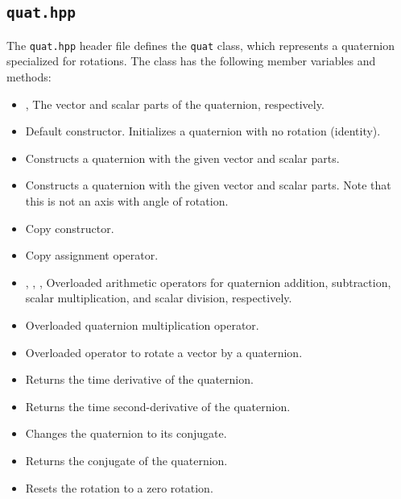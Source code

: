 \documentclass[a4paper,onecolumn,11pt]{doofus}
\begin{document}
\subsection{\texttt{quat.hpp}}

The \texttt{quat.hpp} header file defines the \texttt{quat} class, which represents a quaternion specialized for rotations. The class has the following member variables and methods:

\begin{itemize}
\item {},  The vector and scalar parts of the quaternion, respectively.
\item {} Default constructor. Initializes a quaternion with no rotation (identity).
\item {} Constructs a quaternion with the given vector and scalar parts.
\item {} Constructs a quaternion with the given vector and scalar parts. Note that this is not an axis with angle of rotation.
\item {} Copy constructor.
\item {} Copy assignment operator.
\item {}, , ,  Overloaded arithmetic operators for quaternion addition, subtraction, scalar multiplication, and scalar division, respectively.
\item {} Overloaded quaternion multiplication operator.
\item {} Overloaded operator to rotate a vector by a quaternion.
\item {} Returns the time derivative of the quaternion.
\item {} Returns the time second-derivative of the quaternion.
\item {} Changes the quaternion to its conjugate.
\item {} Returns the conjugate of the quaternion.
\item {} Resets the rotation to a zero rotation.

\end{itemize}
\end{document}
